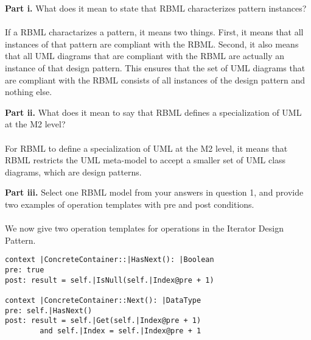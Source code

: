 \documentclass{article}
\begin{document}
{\bf Part i.} 
What does it mean to state that RBML characterizes pattern instances? \\\\
If a RBML charactarizes a pattern, it means two things. First, it means that all instances of that pattern are compliant with the RBML. Second, it also means that all UML diagrams that are compliant with the RBML are actually an instance of that design pattern. This ensures that the set of UML diagrams that are compliant with the RBML consists of all instances of the design pattern and nothing else.
\newline

\noindent
{\bf Part ii.} 
What does it mean to say that RBML defines a specialization of UML at the M2 level? \\\\
For RBML to define a specialization of UML at the M2 level, it means that RBML restricts the UML meta-model to accept a smaller set of UML class diagrams, which are design patterns.
\newline

\noindent
{\bf Part iii.} 
Select one RBML model from your answers in question 1, and provide two examples of
operation templates with pre and post conditions. \\\\
We now give two operation templates for operations in the Iterator Design Pattern.

\begin{Verbatim}
context |ConcreteContainer::|HasNext(): |Boolean
pre: true
post: result = self.|IsNull(self.|Index@pre + 1)
		
context |ConcreteContainer::Next(): |DataType
pre: self.|HasNext()
post: result = self.|Get(self.|Index@pre + 1)
		and self.|Index = self.|Index@pre + 1
\end{Verbatim}
\end{document}
